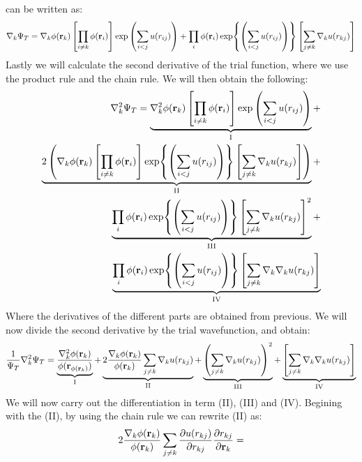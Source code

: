 \documentclass[a4paper, 10pt]{article}
\begin{document}
\begin{appendices}
  can be written as:
  \begin{align}
    \nabla_{k}\Psi_{T} =
    \nabla_k \phi(\mathbf{r}_k)\left[ \prod_{i\neq k} \phi(\mathbf{r}_i)\right]\exp\left(\sum_{i<j}u(r_{ij})\right)
    + \prod_{i}\phi(\bold{r}_{i})
      \exp{\left(\sum_{i<j}u(r_{ij})\right)}
      \left[\sum_{j \neq k}\nabla_{k}u(r_{kj})\right]
  \end{align}
Lastly we will calculate the second derivative of the trial function, where we
use the product rule and the chain rule. We will then obtain the following:
\begin{align*}
  \begin{split}
  \nabla_{k}^2\Psi_{T} =
  \underbrace{\nabla_k^2 \phi(\mathbf{r}_k)\left[ \prod_{i\neq k} \phi(\mathbf{r}_i)\right]\exp\left(\sum_{i<j}u(r_{ij})\right)}_{\mathrm{I}} +\\
   \underbrace{2\left(\nabla_k \phi(\mathbf{r}_k)\left[ \prod_{i\neq k} \phi(\mathbf{r}_i)\right]
  \exp{\left(\sum_{i<j}u(r_{ij})\right)}
  \left[\sum_{j \neq k}\nabla_{k}u(r_{kj})\right]\right)}_{\mathrm{II}} +
  \\
   \underbrace{\prod_{i}\phi(\bold{r}_{i})
    \exp{\left(\sum_{i<j}u(r_{ij})\right)}
    \left[\sum_{j \neq k}\nabla_{k}u(r_{kj})\right]^2}_{\mathrm{III}} +
    \\
    \underbrace{\prod_{i}\phi(\bold{r}_{i})
      \exp{\left(\sum_{i<j}u(r_{ij})\right)}
      \left[\sum_{j \neq k}\nabla_{k}\nabla_{k}u(r_{kj})\right]}_{\mathrm{IV}}
  \end{split}
\end{align*}
Where the derivatives of the different parts are obtained from previous.
We will now divide the second derivative by the trial wavefunction, and obtain:
\begin{align}
\frac{1}{\Psi_{T}}\nabla_{k}^2\Psi_{T} =
\underbrace{\frac{\nabla_{k}^2\phi{(\bold{r}_{k})}}{\phi(\bold{r}_{\phi(\bold{r}_{k})})}}_{\mathrm{I}}
+ \underbrace{2\frac{\nabla_{k}\phi(\bold{r}_{k})}{\phi{(\bold{r}_{k})}}\sum_{j\neq k}\nabla_{k}u(r_{kj})}_{\mathrm{II}}
+ \underbrace{\left(\sum_{j\neq k}\nabla_{k} u(r_{kj})\right)^2}_{\mathrm{III}} +
\underbrace{\left[\sum_{j \neq k}\nabla_{k}\nabla_{k}u(r_{kj})\right]}_{\mathrm{IV}}
\end{align}
We will now carry out the differentiation in term (II), (III) and (IV). Begining with the
(II), by using the chain rule we can rewrite (II) as:
\begin{align*}
2\frac{\nabla_{k}\phi(\bold{r}_{k})}{\phi{(\bold{r}_{k})}}\sum_{j\neq k}\pdv{u(r_{kj})}{r_{kj}}\pdv{r_{kj}}{\bold{r}_{k}} =

\end{align*}
\end{appendices}
\end{document}
